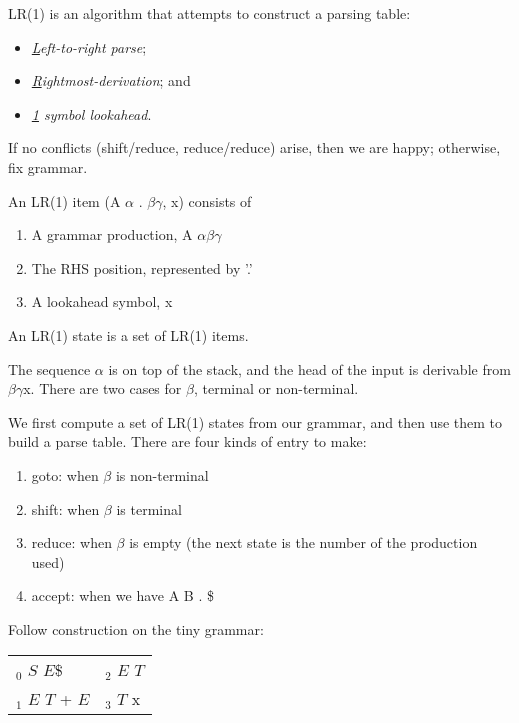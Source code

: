 \begin{slide*}
LR(1) is an algorithm that attempts to construct a parsing table:
\begin{itemize}
\item {\em \underline{L}eft-to-right parse};
\item {\em \underline{R}ightmost-derivation}; and
\item {\em \underline{1} symbol lookahead}.
\end{itemize}
If no conflicts (shift/reduce, reduce/reduce) arise, then we are happy;
otherwise, fix grammar.

\vspace{0.1in}

An LR(1) item (A \RA{} $\alpha$ . $\beta\gamma$, x) consists of
\begin{enumerate}
\item A grammar production, A \RA{} $\alpha\beta\gamma$
\item The RHS position, represented by '.'
\item A lookahead symbol, x
\end{enumerate}

An LR(1) state is a set of LR(1) items.

\vspace{0.1in}

The sequence $\alpha$ is on top of the stack, and the head of the
input is derivable from $\beta\gamma$x.  There are two cases for $\beta$,
terminal or non-terminal.
\vfil
\end{slide*}

\begin{slide*}
We first compute a set of LR(1) states from our grammar, and then use
them to build a parse table.  There are four kinds of entry to make:
\begin{enumerate}
\item goto: when $\beta$ is non-terminal
\item shift: when $\beta$ is terminal
\item reduce: when $\beta$ is empty (the next state is the number of
  the production used)
\item accept: when we have A \RA{} B . \$
\end{enumerate}

\vspace{0.1in}

Follow construction on the tiny grammar:

\begin{tabular}{l@{~~~~~~~}l}
$_0$ $S$ \RA{} $E$\$ & $_2$ $E$ \RA{} $T$\\
$_1$ $E$ \RA{} $T$ + $E$ & $_3$ $T$ \RA{} x
\end{tabular}

\vspace{0.1in}

% 

\vfil
\end{slide*}



